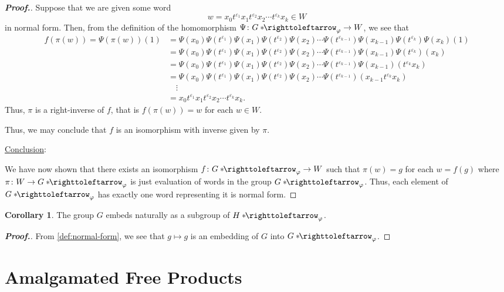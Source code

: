 \documentclass[11pt,a4paper,reqno]{amsart}
\theoremstyle{plain}
\theoremstyle{definition}
\newtheorem{corollary}{Corollary}[theorem]
\theoremstyle{definition}
\newenvironment{myproof}{\begin{proof}[\normalfont\bfseries Proof.]}{\end{proof}}
\newcommand\hnn{*\!\!\righttoleftarrow}
\begin{document}
\begin{myproof}
	Suppose that we are given some word
	\[
		w = x_0 t^{\varepsilon_1} x_1 t^{\varepsilon_2} x_2 \cdots t^{\varepsilon_k} x_k \in W
	\]
	in normal form. Then, from the definition of the homomorphism $\Psi\colon G\hnn_\varphi\to W$, we see that
	\begin{align*}
		f(\pi(w))=
		\Psi(\pi(w))(1)
		 & =
		\Psi(x_0) \Psi(t^{\varepsilon_1})\Psi(x_1)
		\Psi(t^{\varepsilon_2})\Psi(x_2)
		\cdots
		\Psi(t^{\varepsilon_{k-1}})\Psi(x_{k-1})
		\Psi(t^{\varepsilon_k})\Psi(x_k)(1)
		\\
		 & =
		\Psi(x_0) \Psi(t^{\varepsilon_1})\Psi(x_1)
		\Psi(t^{\varepsilon_2})\Psi(x_2)
		\cdots
		\Psi(t^{\varepsilon_{k-1}})\Psi(x_{k-1})
		\Psi(t^{\varepsilon_k})(x_k)
		\\
		 & =
		\Psi(x_0) \Psi(t^{\varepsilon_1})\Psi(x_1)
		\Psi(t^{\varepsilon_2})\Psi(x_2)
		\cdots
		\Psi(t^{\varepsilon_{k-1}})\Psi(x_{k-1})
		(t^{\varepsilon_k}x_k)
		\\
		 & =
		\Psi(x_0) \Psi(t^{\varepsilon_1})\Psi(x_1)
		\Psi(t^{\varepsilon_2})\Psi(x_2)
		\cdots
		\Psi(t^{\varepsilon_{k-1}})(x_{k-1}t^{\varepsilon_k}x_k)
		\\
		 & \quad\vdots
		\\
		 & =
		x_0 t^{\varepsilon_1} x_1 t^{\varepsilon_2} x_2 \cdots t^{\varepsilon_k} x_k.
	\end{align*}
	Thus, $\pi$ is a right-inverse of $f$, that is $f(\pi(w)) = w$ for each $w\in W$.

	Thus, we may conclude that $f$ is an isomorphism with inverse given by $\pi$.

	\medskip
	\noindent
	\underline{Conclusion}:

	\smallskip
	\noindent
	We have now shown that there exists an isomorphism $f\colon G\hnn_\varphi \to W$ such that $\pi(w)=g$ for each $w=f(g)$ where $\pi\colon W\to G\hnn_\varphi$ is just evaluation of words in the group $G\hnn_\varphi$.
	Thus, each element of $G\hnn_\varphi$ has exactly one word representing it is normal form.
\end{myproof}

\begin{corollary}\label{lem:hnn-embedding}
  The group $G$ embeds naturally as a subgroup of $H\hnn_\varphi$.
\end{corollary}
\begin{myproof}
  From \cref{def:normal-form}, we see that $g\mapsto g$ is an embedding of $G$ into $G\hnn_\varphi$.
\end{myproof}

\section{Amalgamated Free Products}
\end{document}
